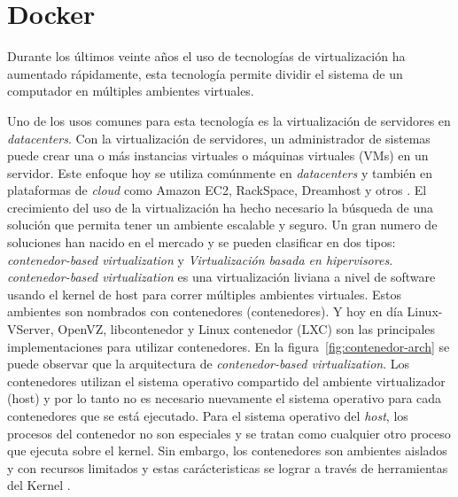 \section{Docker}

Durante los últimos veinte años el uso de tecnologías de virtualización ha aumentado
	rápidamente, esta tecnología permite dividir el sistema de un computador
	en múltiples ambientes virtuales. 

Uno de los usos comunes para esta tecnología es la virtualización de 
	servidores en \textit{datacenters}. Con la virtualización de servidores, un
	administrador de sistemas puede crear una o más instancias virtuales o 
	máquinas virtuales (VMs) en un servidor. Este enfoque hoy se utiliza comúnmente en \textit{datacenters} y también en plataformas de \textit{cloud} como Amazon 	EC2, RackSpace, Dreamhost y otros \cite{felter2014updated}. 
El crecimiento del uso de la virtualización ha hecho necesario la búsqueda de una solución que permita tener un ambiente escalable y seguro. Un gran numero de
	soluciones han nacido en el mercado y se pueden clasificar en dos tipos:
	\textit{contenedor-based virtualization} y \textit{Virtualización basada en hipervisores}.
\textit{contenedor-based virtualization} es una virtualización liviana a
	nivel de software usando el kernel de host para correr múltiples ambientes virtuales.
Estos ambientes son nombrados con contenedores (contenedores).
	Y hoy en día Linux-VServer, OpenVZ, libcontenedor y Linux contenedor (LXC) son
	las principales implementaciones para utilizar contenedores. En la
	figura~\ref{fig:contenedor-arch} se puede observar que la arquitectura de
	\textit{contenedor-based virtualization}. Los contenedores utilizan el sistema	operativo compartido del ambiente virtualizador (host) y por lo tanto no es necesario nuevamente el sistema operativo para cada contenedores que se está ejecutado.
Para el sistema operativo del \textit{host}, los procesos del contenedor no son especiales y se tratan como cualquier otro proceso que ejecuta sobre el kernel. 
Sin embargo, los contenedores son ambientes aislados y con recursos limitados y estas carácteristicas se lograr a través de herramientas del Kernel \cite{merkel2014docker}.
	
